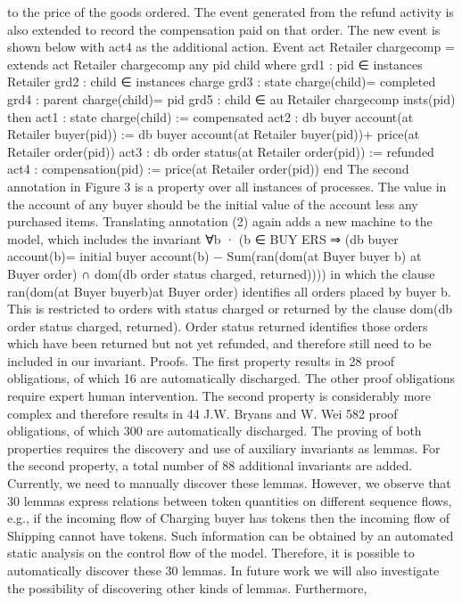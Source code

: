 to the price of the goods ordered. The event generated from the refund activity
is also extended to record the compensation paid on that order. The new event
is shown below with act4 as the additional action.
Event act Retailer chargecomp = extends act Retailer chargecomp
any
pid
child where
grd1 : pid ∈ instances Retailer
grd2 : child ∈ instances charge
grd3 : state charge(child)= completed
grd4 : parent charge(child)= pid
grd5 : child ∈ au Retailer chargecomp insts(pid) then
act1 : state charge(child) := compensated
act2 : db buyer account(at Retailer buyer(pid)) := db buyer account(at Retailer buyer(pid))+
price(at Retailer order(pid))
act3 : db order status(at Retailer order(pid)) := refunded
act4 : compensation(pid) := price(at Retailer order(pid)) end
The second annotation in Figure 3 is a property over all instances of processes.
The value in the account of any buyer should be the initial value of the account
less any purchased items. Translating annotation (2) again adds a new machine
to the model, which includes the invariant
∀b · (b ∈ BUY ERS ⇒
(db buyer account(b)= initial buyer account(b) −
Sum(ran(dom(at Buyer buyer  {b})  at Buyer order)
∩
dom(db order status  {charged, returned}))))
in which the clause ran(dom(at Buyer buyer{b})at Buyer order) identifies
all orders placed by buyer b. This is restricted to orders with status charged
or returned by the clause dom(db order status  {charged, returned}). Order
status returned identifies those orders which have been returned but not yet
refunded, and therefore still need to be included in our invariant.
Proofs. The first property results in 28 proof obligations, of which 16 are automatically discharged. The other proof obligations require expert human intervention. The second property is considerably more complex and therefore results in
44 J.W. Bryans and W. Wei
582 proof obligations, of which 300 are automatically discharged. The proving of
both properties requires the discovery and use of auxiliary invariants as lemmas.
For the second property, a total number of 88 additional invariants are added.
Currently, we need to manually discover these lemmas. However, we observe
that 30 lemmas express relations between token quantities on different sequence
flows, e.g., if the incoming flow of Charging buyer has tokens then the incoming flow of Shipping cannot have tokens. Such information can be obtained by
an automated static analysis on the control flow of the model. Therefore, it is
possible to automatically discover these 30 lemmas. In future work we will also
investigate the possibility of discovering other kinds of lemmas. Furthermore,

